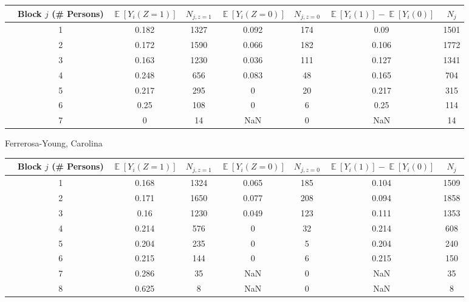 \documentclass[11pt,notitlepage]{article}
\def\E{\mathop{\mathbb{E}}}
\begin{document}
\begin{table}[h!]\small
\begin{center}
\begin{tabular}{rc|cc|cc|cc}
  \hline
 & Block $j$ (\# Persons) & $\E[Y_i(Z=1)]$ & $N_{j, z=1}$ & $\E[Y_i(Z=0)]$ & $N_{j, z=0}$ & $\E[Y_i(1)]-\E[Y_i(0)]$ & $N_j$ \\ 
  \hline
 & 1 & 0.182 & 1327 & 0.092 & 174 & 0.09 & 1501 \\ 
 & 2 & 0.172 & 1590 & 0.066 & 182 & 0.106 & 1772 \\ 
 & 3 & 0.163 & 1230 & 0.036 & 111 & 0.127 & 1341 \\ 
 & 4 & 0.248 & 656 & 0.083 & 48 & 0.165 & 704 \\ 
 & 5 & 0.217 & 295 & 0 & 20 & 0.217 & 315 \\ 
 & 6 & 0.25 & 108 & 0 & 6 & 0.25 & 114 \\ 
 & 7 & 0 & 14 & NaN & 0 & NaN & 14 \\ 
   \hline
\end{tabular}
\end{center}
\end{table}




Ferrerosa-Young, Carolina


\begin{table}[h!]\small
\begin{center}
\begin{tabular}{rc|cc|cc|cc}
  \hline
 & Block $j$ (\# Persons) & $\E[Y_i(Z=1)]$ & $N_{j, z=1}$ & $\E[Y_i(Z=0)]$ & $N_{j, z=0}$ & $\E[Y_i(1)]-\E[Y_i(0)]$ & $N_j$ \\ 
  \hline
  & 1 & 0.168 & 1324 & 0.065 & 185 & 0.104 & 1509 \\ 
  & 2 & 0.171 & 1650 & 0.077 & 208 & 0.094 & 1858 \\ 
  & 3 & 0.16 & 1230 & 0.049 & 123 & 0.111 & 1353 \\ 
  & 4 & 0.214 & 576 & 0 & 32 & 0.214 & 608 \\ 
  & 5 & 0.204 & 235 & 0 & 5 & 0.204 & 240 \\ 
  & 6 & 0.215 & 144 & 0 & 6 & 0.215 & 150 \\ 
  & 7 & 0.286 & 35 & NaN & 0 & NaN & 35 \\ 
  & 8 & 0.625 & 8 & NaN & 0 & NaN & 8 \\ 
   \hline
\end{tabular}
\end{center}
\end{table}
\end{document}
